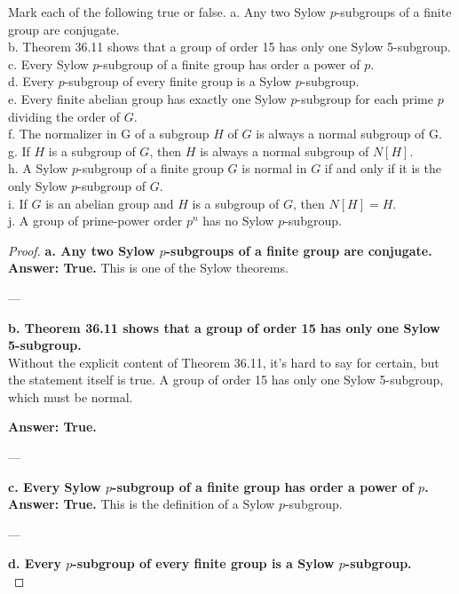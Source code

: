 \documentclass[12pt]{amsart}
\theoremstyle{definition}
\numberwithin{equation}{section}
\theoremstyle{plain}
\begin{document}
\begin{exercise}{10} 
Mark each of the following true or false.
a. Any two Sylow $p$-subgroups of a finite group are conjugate.\\
b. Theorem 36.11 shows that a group of order 15 has only one Sylow 5-subgroup.\\
c. Every Sylow $p$-subgroup of a finite group has order a power of $p$.\\
d. Every $p$-subgroup of every finite group is a Sylow $p$-subgroup.\\
e. Every finite abelian group has exactly one Sylow $p$-subgroup for each prime $p$ dividing the order of $G$.\\
f. The normalizer in G of a subgroup $H$ of $G$ is always a normal subgroup of G.\\
g. If $H$ is a subgroup of $G$, then $H$ is always a normal subgroup of $N[H]$.\\
h. A Sylow $p$-subgroup of a finite group $G$ is normal in $G$ if and only if it is the only Sylow $p$-subgroup of $G$.\\
i. If $G$ is an abelian group and $H$ is a subgroup of $G$, then $N[H] = H$.\\
j. A group of prime-power order $p^n$ has no Sylow $p$-subgroup.\\
    
    \begin{proof}
\textbf{a. Any two Sylow \( p \)-subgroups of a finite group are conjugate.}\\

\textbf{Answer: True.} This is one of the Sylow theorems.

---

\textbf{b. Theorem 36.11 shows that a group of order 15 has only one Sylow 5-subgroup.}\\

Without the explicit content of Theorem 36.11, it's hard to say for certain, but the statement itself is true. A group of order 15 has only one Sylow 5-subgroup, which must be normal.

\textbf{Answer: True.}

---

\textbf{c. Every Sylow \( p \)-subgroup of a finite group has order a power of \( p \).}\\

\textbf{Answer: True.} This is the definition of a Sylow \( p \)-subgroup.

---

\textbf{d. Every \( p \)-subgroup of every finite group is a Sylow \( p \)-subgroup.}\\


\end{proof}
\end{exercise}
\end{document}
